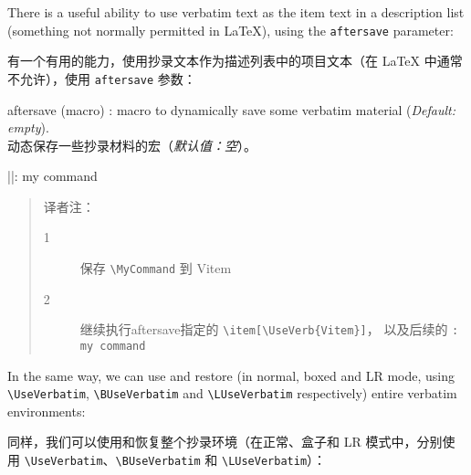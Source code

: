 \documentclass[twoside]{article}
\newcommand\cs[1]{\texttt{\textbackslash#1}}
\providecommand\optname[1]{\textsf{#1}}
\newenvironment{optlist}{\begin{description}%
  \renewcommand\makelabel[1]{%
    \descriptionlabel{\mdseries\optname{##1}}}%
  \itemsep0.25\itemsep}%
 {\end{description}}
\begin{document}
There is a useful ability to use verbatim text as the item text in a
description list (something not normally permitted in \LaTeX), using the
\texttt{aftersave} parameter:

有一个有用的能力，使用抄录文本作为描述列表中的项目文本（在 \LaTeX{} 中通常不允许），使用 \texttt{aftersave} 参数：


\begin{optlist}
  \item[aftersave (macro)]: macro to dynamically save some verbatim material
  (\emph{Default: empty}).
\\动态保存一些抄录材料的宏（\emph{默认值：空}）。
\end{optlist}


\begin{SideBySideExample}
  \newcommand{\Vitem}{%
    }
  \DefineShortVerb{\|}
  \begin{description}
    \Vitem|\MyCommand|: my command
  \end{description}
\end{SideBySideExample}

\begin{quotation}
译者注：
\begin{description}
  \item[1] 保存 \verb|\MyCommand| 到 Vitem
  \item[2] 继续执行aftersave指定的 \verb|\item[\UseVerb{Vitem}]|， 以及后续的 \verb|: my command|
\end{description}
\end{quotation}

In the same way, we can use and restore (in normal, boxed and LR mode,
using \cs{UseVerbatim}, \cs{BUseVerbatim} and \cs{LUseVerbatim} respectively)
entire verbatim environments:

同样，我们可以使用和恢复整个抄录环境（在正常、盒子和 LR 模式中，分别使用 \cs{UseVerbatim}、\cs{BUseVerbatim} 和 \cs{LUseVerbatim}）：
\end{document}
